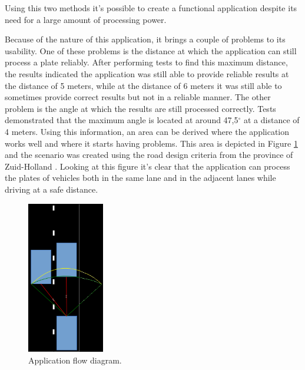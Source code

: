 Using this two methods it's possible to create a functional application despite its need for a large amount of processing power.



Because of the nature of this application, it brings a couple of problems to its usability. One of these problems is the distance at which the application can still process a plate reliably. After performing tests to find this maximum distance, the results indicated the application was still able to provide reliable results at the distance of 5 meters, while at the distance of 6 meters it was still able to sometimes provide correct results but not in a reliable manner. The other problem is the angle at which the results are still processed correctly. Tests demonstrated that the maximum angle is located at around 47,5$^{\circ}$ at a distance of 4 meters. Using this information, an area can be derived where the application works well and where it starts having problems. This area is depicted in Figure \ref{fig:road-situation} and the scenario was created using the road design criteria from the province of Zuid-Holland \cite{road-design}. Looking at this figure it's clear that the application can process the plates of vehicles both in the same lane and in the adjacent lanes while driving at a safe distance.

\begin{figure}[ht]
    \centering
    \includegraphics[width=0.3\textwidth]{plaatjes/roadeye-road}
    \caption{Application flow diagram.}
    \label{fig:road-situation}
\end{figure}%


